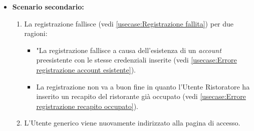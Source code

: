 \begin{itemize}
    \item \textbf{Scenario secondario:}
                \begin{enumerate}
                    \item La registrazione fallisce (vedi \autoref{usecase:Registrazione fallita}) per due ragioni:
                    \begin{itemize}
                        \item "La registrazione fallisce a causa dell'esistenza di un \textit{account} preesistente con le stesse credenziali inserite (vedi \autoref{usecase:Errore registrazione account esistente}).
                        \item La registrazione non va a buon fine in quanto l'Utente Ristoratore ha inserito un recapito del ristorante già occupato (vedi \autoref{usecase:Errore registrazione recapito occupato}).
                    \end{itemize}
                    \item L'Utente generico viene nuovamente indirizzato alla pagina di accesso.
                \end{enumerate}	
          
	
\end{itemize}


